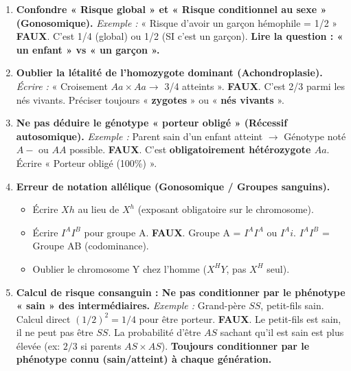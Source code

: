 \documentclass[11pt]{article}
\begin{document}
\begin{attention}
    \begin{enumerate}
        \item \textbf{Confondre « Risque global » et « Risque conditionnel au sexe » (Gonosomique).}
              \textit{Exemple :} « Risque d'avoir un garçon hémophile = 1/2 » \textbf{FAUX}. C'est 1/4 (global) ou 1/2 (SI c'est un garçon). \textbf{Lire la question : « un enfant » vs « un garçon ».}
        \item \textbf{Oublier la létalité de l'homozygote dominant (Achondroplasie).}
              \textit{Écrire :} « Croisement $Aa \times Aa \rightarrow$ 3/4 atteints ». \textbf{FAUX}. C'est 2/3 parmi les nés vivants. Préciser toujours « \textbf{zygotes} » ou « \textbf{nés vivants} ».
        \item \textbf{Ne pas déduire le génotype « porteur obligé » (Récessif autosomique).}
              \textit{Exemple :} Parent sain d'un enfant atteint $\rightarrow$ Génotype noté $A-$ ou $AA$ possible. \textbf{FAUX}. C'est \textbf{obligatoirement hétérozygote $Aa$}. Écrire « Porteur obligé (100\%) ».
        \item \textbf{Erreur de notation allélique (Gonosomique / Groupes sanguins).}
              \begin{itemize}
                  \item Écrire $Xh$ au lieu de $X^h$ (exposant obligatoire sur le chromosome).
                  \item Écrire $I^A I^B$ pour groupe A. \textbf{FAUX}. Groupe A = $I^A I^A$ ou $I^A i$. $I^A I^B$ = Groupe AB (codominance).
                  \item Oublier le chromosome Y chez l'homme ($X^H Y$, pas $X^H$ seul).
              \end{itemize}
        \item \textbf{Calcul de risque consanguin : Ne pas conditionner par le phénotype « sain » des intermédiaires.}
              \textit{Exemple :} Grand-père $SS$, petit-fils sain. Calcul direct $(1/2)^2 = 1/4$ pour être porteur. \textbf{FAUX}. Le petit-fils est sain, il ne peut pas être $SS$. La probabilité d'être $AS$ sachant qu'il est sain est plus élevée (ex: $2/3$ si parents $AS \times AS$). \textbf{Toujours conditionner par le phénotype connu (sain/atteint) à chaque génération.}
    \end{enumerate}
\end{attention}
\end{document}
